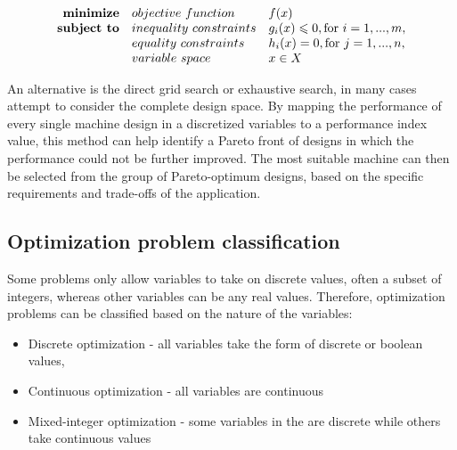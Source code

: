         
    \begin{equation}
        \begin{array}{rll}
            \textbf{minimize}       & \small{objective\,\,function}         & f(x)\\ 
            \textbf{subject to}     & \small{inequality\,\,constraints}     & g_i(x) \leqslant 0, \text{for } i= 1,...,m,\\ 
                                    & \small{equality\,\,constraints}       & h_i(x) = 0, \text{for } j= 1,...,n,\\ 
                                    & \small{variable\,\,space}             & x \in X
        \end{array}
    \end{equation}
    
    
    An alternative is the direct grid search or exhaustive search, in many cases attempt to consider the complete design space. By mapping the performance of every single machine design in a discretized variables to a performance index value, this method can help identify a Pareto front of designs in which the performance could not be further improved. The most suitable machine can then be selected from the group of Pareto-optimum designs, based on the specific requirements and trade-offs of the application.
    
    
    \subsection{Optimization problem classification}    \label{Chapter:background/optimization methods/optimization prob classification}

        
        Some problems only allow variables to take on discrete values, often a subset of integers, whereas other variables can be any real values. Therefore, optimization problems can be classified based on the nature of the variables:

        \begin{itemize}
            \item Discrete optimization - all variables take the form of discrete or boolean values,
            \item Continuous optimization - all variables are continuous
            \item Mixed-integer optimization - some variables in the are discrete while others take continuous values
        \end{itemize}
   
